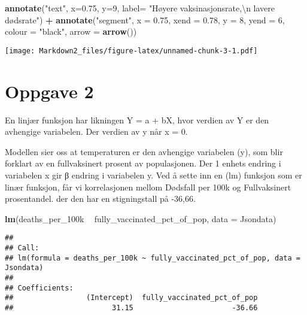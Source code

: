 \documentclass[
]{article}
\newenvironment{Shaded}{\begin{snugshade}}{\end{snugshade}}
\newcommand{\CharTok}[1]{\textcolor[rgb]{0.31,0.60,0.02}{#1}}
\newcommand{\DataTypeTok}[1]{\textcolor[rgb]{0.13,0.29,0.53}{#1}}
\newcommand{\DecValTok}[1]{\textcolor[rgb]{0.00,0.00,0.81}{#1}}
\newcommand{\FloatTok}[1]{\textcolor[rgb]{0.00,0.00,0.81}{#1}}
\newcommand{\KeywordTok}[1]{\textcolor[rgb]{0.13,0.29,0.53}{\textbf{#1}}}
\newcommand{\NormalTok}[1]{#1}
\newcommand{\OperatorTok}[1]{\textcolor[rgb]{0.81,0.36,0.00}{\textbf{#1}}}
\newcommand{\StringTok}[1]{\textcolor[rgb]{0.31,0.60,0.02}{#1}}
\begin{document}
\begin{Shaded}
\begin{Highlighting}[]
\StringTok{  }\KeywordTok{annotate}\NormalTok{(}\StringTok{"text"}\NormalTok{, }\DataTypeTok{x=}\FloatTok{0.75}\NormalTok{, }\DataTypeTok{y=}\DecValTok{9}\NormalTok{, }
           \DataTypeTok{label=} \StringTok{"Høyere vaksinasjonsrate,}\CharTok{\textbackslash{}n}\StringTok{ lavere dødsrate"}\NormalTok{) }\OperatorTok{+}
\StringTok{  }\KeywordTok{annotate}\NormalTok{(}\StringTok{"segment"}\NormalTok{, }\DataTypeTok{x =} \FloatTok{0.75}\NormalTok{, }
           \DataTypeTok{xend =} \FloatTok{0.78}\NormalTok{, }\DataTypeTok{y =} \DecValTok{8}\NormalTok{, }
           \DataTypeTok{yend =} \DecValTok{6}\NormalTok{, }\DataTypeTok{colour =} \StringTok{"black"}\NormalTok{, }\DataTypeTok{arrow =} \KeywordTok{arrow}\NormalTok{())}
\end{Highlighting}
\end{Shaded}

\texttt{[image: Markdown2\_files/figure-latex/unnamed-chunk-3-1.pdf]}

\hypertarget{oppgave-2}{%
\section{Oppgave 2}\label{oppgave-2}}

En linjær funksjon har likningen Y = a + bX, hvor verdien av Y er den
avhengige variabelen. Der verdien av y når x = 0.

Modellen sier oss at temperaturen er den avhengige variabelen (y), som
blir forklart av en fullvaksinert prosent av populasjonen. Der 1 enhets
endring i variabelen x gir β endring i variabelen y. Ved å sette inn en
(lm) funksjon som er linær funksjon, får vi korrelasjonen mellom
Dødsfall per 100k og Fullvaksinert prosentandel. der den har en
stigningstall på -36,66.

\begin{Shaded}
\begin{Highlighting}[]
\KeywordTok{lm}\NormalTok{(deaths_per_100k }\OperatorTok{~}\StringTok{ }\NormalTok{fully_vaccinated_pct_of_pop, }\DataTypeTok{data =}\NormalTok{ Jsondata)}
\end{Highlighting}
\end{Shaded}

\begin{verbatim}
## 
## Call:
## lm(formula = deaths_per_100k ~ fully_vaccinated_pct_of_pop, data = Jsondata)
## 
## Coefficients:
##                 (Intercept)  fully_vaccinated_pct_of_pop  
##                       31.15                       -36.66
\end{verbatim}
\end{document}
